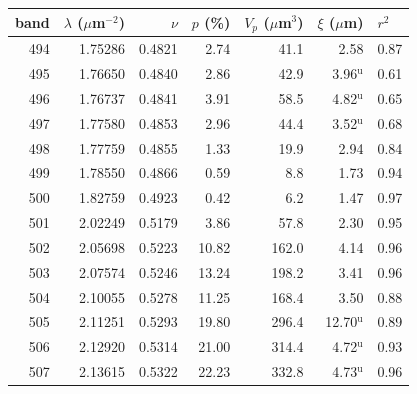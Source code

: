 \begin{tabular}{@{}rrrrrrl@{}}
\hline\hline
 band & $\lambda$ ($\mu$m$^{-2}$) & $\nu$ & $p$ (\%) & $V_p$ ($\mu$m$^3$) & $\xi$ ($\mu$m) & $r^2$ \\
\hline
 494 & 1.75286 & 0.4821 & 2.74 & 41.1 & 2.58 & 0.87 \\
 495 & 1.76650 & 0.4840 & 2.86 & 42.9 & 3.96$^\mathrm{u}$ & 0.61 \\
 496 & 1.76737 & 0.4841 & 3.91 & 58.5 & 4.82$^\mathrm{u}$ & 0.65 \\
 497 & 1.77580 & 0.4853 & 2.96 & 44.4 & 3.52$^\mathrm{u}$ & 0.68 \\
 498 & 1.77759 & 0.4855 & 1.33 & 19.9 & 2.94 & 0.84 \\
 499 & 1.78550 & 0.4866 & 0.59 & 8.8 & 1.73 & 0.94 \\
 500 & 1.82759 & 0.4923 & 0.42 & 6.2 & 1.47 & 0.97 \\
 501 & 2.02249 & 0.5179 & 3.86 & 57.8 & 2.30 & 0.95 \\
 502 & 2.05698 & 0.5223 & 10.82 & 162.0 & 4.14 & 0.96 \\
 503 & 2.07574 & 0.5246 & 13.24 & 198.2 & 3.41 & 0.96 \\
 504 & 2.10055 & 0.5278 & 11.25 & 168.4 & 3.50 & 0.88 \\
 505 & 2.11251 & 0.5293 & 19.80 & 296.4 & 12.70$^\mathrm{u}$ & 0.89 \\
 506 & 2.12920 & 0.5314 & 21.00 & 314.4 & 4.72$^\mathrm{u}$ & 0.93 \\
 507 & 2.13615 & 0.5322 & 22.23 & 332.8 & 4.73$^\mathrm{u}$ & 0.96 \\
\hline\hline
\end{tabular}
